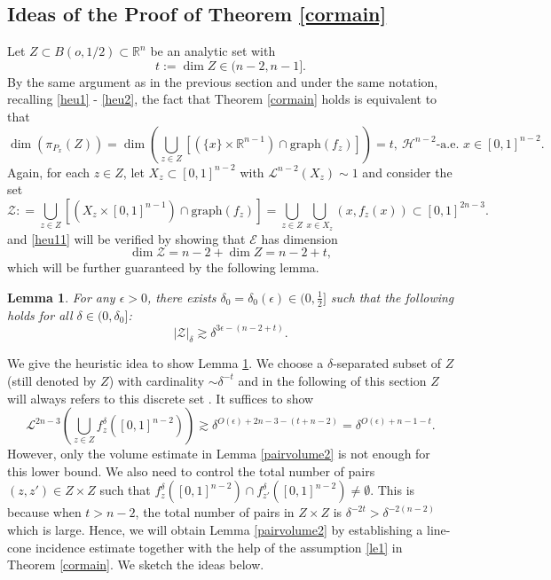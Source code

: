 \documentclass[11pt,a4paper,reqno]{amsart}
\newcommand{\R}{\mathbb{R}}
\newcommand{\calL}{\mathcal{L}}
\newcommand{\calE}{\mathcal{E}}
\newcommand{\1}{\mathbf{1}}
\numberwithin{equation}{section}
\theoremstyle{plain}
\newtheorem{lemma}[equation]{Lemma}
\theoremstyle{definition}
\theoremstyle{remark}
\begin{document}
\subsection{Ideas of the Proof of Theorem \ref{cormain}}
Let $Z \subset B(o,1/2) \subset \R^n$ be an analytic set with
$$  t:=\dim Z \in (n-2,n-1].   $$
By the same argument as in the previous section and under the same notation, recalling \eqref{heu1} - \eqref{heu2},
the fact that Theorem \ref{cormain} holds is equivalent to that
\begin{equation}\label{heu11}
  \dim (\pi_{P_x}(Z)) = \dim (\bigcup_{z \in Z} [(\{x\} \times \R^{n-1}) \cap \mbox{graph}(f_z)])  =t, \ \mathcal{H}^{n-2}\mbox{-a.e. } x \in [0,1]^{n-2}.
\end{equation}
Again, for each $z \in Z$, let $X_z \subset [0,1]^{n-2}$ with $\calL^{n-2}(X_z) \sim 1$ and consider the set
\begin{equation}\label{heu31}
    \mathcal{Z}: = \bigcup_{z \in Z} [(X_z \times [0,1]^{n-1}) \cap \mbox{graph}(f_z)] = \bigcup_{z \in Z} \bigcup_{x \in X_z}(x,f_z(x)) \subset [0,1]^{2n-3}.
\end{equation}
and \eqref{heu11} will be verified by showing that $\calE$ has dimension
\begin{equation}\label{heu21}
  \dim \mathcal{Z} = n-2 + \dim Z = n-2 + t,
\end{equation}
which will be further guaranteed by the following lemma.
\begin{lemma}\label{volume2}
For any $\epsilon>0$, there exists $\delta_{0}=\delta_{0}(\epsilon) \in (0,\tfrac{1}{2}]$ such that the following holds for all $\delta \in (0,\delta_{0}]$:
$$|\mathcal{Z}|_{\delta} \gtrsim \delta^{3\epsilon - (n-2 +t)}.$$
\end{lemma}
We give the heuristic idea to show Lemma \ref{volume2}. We choose a $\delta$-separated subset of $Z$ (still denoted by $Z$) with cardinality $\sim \delta^{-t}$ and in the following of this section $Z$ will always refers to this discrete set .
It suffices to show
$$  \calL^{2n-3}(\bigcup_{z \in Z}f_z^\delta([0,1]^{n-2})) \gtrsim    \delta^{O(\epsilon) + 2n-3-(t+ n-2)} = \delta^{O(\epsilon) + n-1-t}.$$
However, only the volume estimate in Lemma \ref{pairvolume2} is not enough for this lower bound. We also need to control the total number of pairs $(z,z') \in Z\times Z$ such that $f_z^\delta([0,1]^{n-2}) \cap f_{z'}^\delta([0,1]^{n-2}) \ne \emptyset$. This is because when $t > n-2$, the total number of pairs in $Z\times Z$ is $\delta^{-2t} > \delta^{-2(n-2)}$ which is large.
Hence,
we will obtain Lemma \ref{pairvolume2} by establishing a line-cone incidence estimate together with the help of the assumption \eqref{le1} in Theorem \ref{cormain}. We sketch the ideas below.
\end{document}
